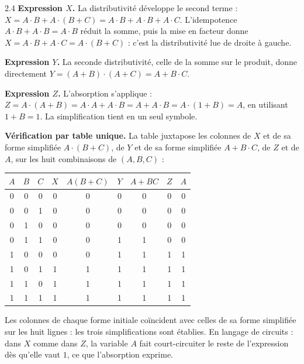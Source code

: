 \begin{corrige}{2.4}
\textbf{Expression $X$.} La distributivité développe le second terme : $X = A \cdot B + A \cdot (B + C) = A \cdot B + A \cdot B + A \cdot C$. L'idempotence $A \cdot B + A \cdot B = A \cdot B$ réduit la somme, puis la mise en facteur donne $X = A \cdot B + A \cdot C = A \cdot (B + C)$ : c'est la distributivité lue de droite à gauche.

\textbf{Expression $Y$.} La seconde distributivité, celle de la somme sur le produit, donne directement $Y = (A + B) \cdot (A + C) = A + B \cdot C$.

\textbf{Expression $Z$.} L'absorption s'applique : $Z = A \cdot (A + B) = A \cdot A + A \cdot B = A + A \cdot B = A \cdot (1 + B) = A$, en utilisant $1 + B = 1$. La simplification tient en un seul symbole.

\textbf{Vérification par table unique.} La table juxtapose les colonnes de $X$ et de sa forme simplifiée $A \cdot (B+C)$, de $Y$ et de sa forme simplifiée $A + B \cdot C$, de $Z$ et de $A$, sur les huit combinaisons de $(A, B, C)$ :

\begin{center}
\setlength{\tabcolsep}{4.5pt}
\begin{tabular}{ccc|c|c|c|c|c|c}
\toprule
\rowcolor{robleuf}$A$ & $B$ & $C$ & $X$ & $A(B{+}C)$ & $Y$ & $A{+}BC$ & $Z$ & $A$ \\
\midrule
0 & 0 & 0 & 0 & 0 & 0 & 0 & 0 & 0 \\
\rowcolor{rogrisf!50}0 & 0 & 1 & 0 & 0 & 0 & 0 & 0 & 0 \\
0 & 1 & 0 & 0 & 0 & 0 & 0 & 0 & 0 \\
\rowcolor{rogrisf!50}0 & 1 & 1 & 0 & 0 & 1 & 1 & 0 & 0 \\
1 & 0 & 0 & 0 & 0 & 1 & 1 & 1 & 1 \\
\rowcolor{rogrisf!50}1 & 0 & 1 & 1 & 1 & 1 & 1 & 1 & 1 \\
1 & 1 & 0 & 1 & 1 & 1 & 1 & 1 & 1 \\
\rowcolor{rogrisf!50}1 & 1 & 1 & 1 & 1 & 1 & 1 & 1 & 1 \\
\bottomrule
\end{tabular}
\end{center}

Les colonnes de chaque forme initiale coïncident avec celles de sa forme simplifiée sur les huit lignes : les trois simplifications sont établies. En langage de circuits : dans $X$ comme dans $Z$, la variable $A$ fait court-circuiter le reste de l'expression dès qu'elle vaut $1$, ce que l'absorption exprime.
\end{corrige}

